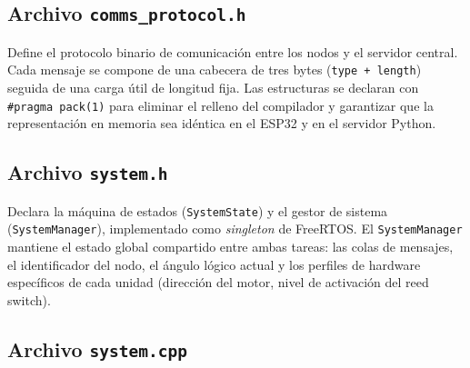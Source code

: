 

\subsection{Archivo \texttt{comms\_protocol.h}}

Define el protocolo binario de comunicación entre los nodos y el servidor central. Cada
mensaje se compone de una cabecera de tres bytes (\texttt{type\,+\,length}) seguida de
una carga útil de longitud fija. Las estructuras se declaran con \texttt{\#pragma~pack(1)}
para eliminar el relleno del compilador y garantizar que la representación en memoria sea
idéntica en el ESP32 y en el servidor Python.



\subsection{Archivo \texttt{system.h}}

Declara la máquina de estados (\texttt{SystemState}) y el gestor de sistema
(\texttt{SystemManager}), implementado como \textit{singleton} de FreeRTOS. El
\texttt{SystemManager} mantiene el estado global compartido entre ambas tareas: las colas
de mensajes, el identificador del nodo, el ángulo lógico actual y los perfiles de hardware
específicos de cada unidad (dirección del motor, nivel de activación del reed switch).



\subsection{Archivo \texttt{system.cpp}}

